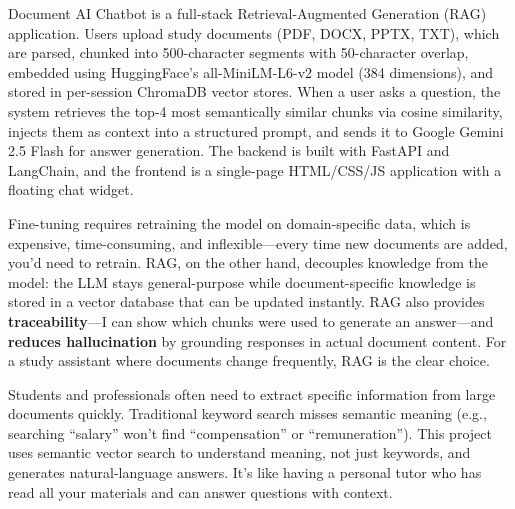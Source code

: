 \documentclass[12pt,a4paper]{article}
\begin{document}
\begin{interviewbox}
\end{interviewbox}
\begin{answerbox}
Document AI Chatbot is a full-stack Retrieval-Augmented Generation (RAG) application. Users upload study documents (PDF, DOCX, PPTX, TXT), which are parsed, chunked into 500-character segments with 50-character overlap, embedded using HuggingFace's all-MiniLM-L6-v2 model (384 dimensions), and stored in per-session ChromaDB vector stores. When a user asks a question, the system retrieves the top-4 most semantically similar chunks via cosine similarity, injects them as context into a structured prompt, and sends it to Google Gemini 2.5 Flash for answer generation. The backend is built with FastAPI and LangChain, and the frontend is a single-page HTML/CSS/JS application with a floating chat widget.
\end{answerbox}

\begin{interviewbox}
\end{interviewbox}
\begin{answerbox}
Fine-tuning requires retraining the model on domain-specific data, which is expensive, time-consuming, and inflexible—every time new documents are added, you'd need to retrain. RAG, on the other hand, decouples knowledge from the model: the LLM stays general-purpose while document-specific knowledge is stored in a vector database that can be updated instantly. RAG also provides \textbf{traceability}—I can show which chunks were used to generate an answer—and \textbf{reduces hallucination} by grounding responses in actual document content. For a study assistant where documents change frequently, RAG is the clear choice.
\end{answerbox}

\begin{interviewbox}
\end{interviewbox}
\begin{answerbox}
Students and professionals often need to extract specific information from large documents quickly. Traditional keyword search misses semantic meaning (e.g., searching ``salary'' won't find ``compensation'' or ``remuneration''). This project uses semantic vector search to understand meaning, not just keywords, and generates natural-language answers. It's like having a personal tutor who has read all your materials and can answer questions with context.
\end{answerbox}
\end{document}
